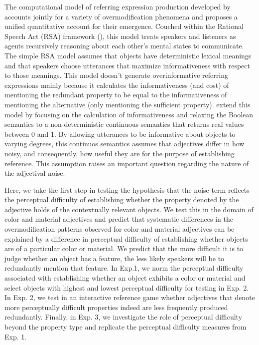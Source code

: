 \documentclass[12pt,letterpaper]{article}
\begin{document}
The computational model of referring expression production developed by \citet{DegenEtAl2020} accounts jointly for a variety of overmodification phenomena and proposes a unified quantitative account for their emergence. Couched within the Rational Speech Act (RSA) framework (\citealt{Goodman2016}), this model treats speakers and listeners as agents recursively reasoning about each other's mental states to communicate. The simple RSA model assumes that objects have deterministic lexical meanings and that speakers choose utterances that maximize informativeness with respect to those meanings. This model doesn't generate overinformative referring expressions mainly because it calculates the informativeness (and cost) of mentioning the redundant property to be equal to the informativeness of mentioning the alternative (only mentioning the sufficient property). \citet{DegenEtAl2020} extend this model by focusing on the calculation of informativeness and relaxing the Boolean semantics to a non-deterministic continuous semantics that returns real values between 0 and 1. By allowing utterances to be informative about objects to varying degrees, this continuos semantics assumes that adjectives differ in how noisy, and consequently, how useful they are for the purpose of establishing reference. This assumption raises an important question regarding the nature of the adjectival noise. 

Here, we take the first step in testing the hypothesis that the noise term reflects the perceptual difficulty of establishing whether the property denoted by the adjective holds of the contextually relevant objects. We test this in the domain of color and material adjectives and predict that systematic differences in the overmodification patterns observed for color and material adjectives can be explained by a difference in perceptual difficulty of establishing whether objects are of a particular color or material. We predict that the more difficult it is to judge whether an object has a feature, the less likely speakers will be to redundantly mention that feature. In Exp.1, we norm the perceptual difficulty associated with establishing whether an object exhibits a color or material and select objects with highest and lowest perceptual difficulty for testing in Exp. 2. In Exp. 2, we test in an interactive reference game whether adjectives that denote more perceptually difficult properties indeed are less frequently produced redundantly. Finally, in Exp. 3, we investigate the role of perceptual difficulty beyond the property type and replicate the perceptual difficulty measures from Exp. 1.
\end{document}
